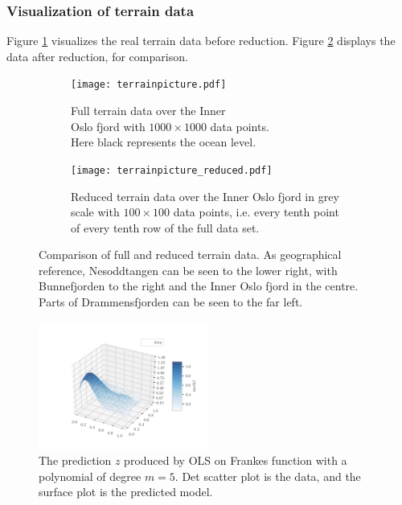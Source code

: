 \subsubsection*{Visualization of terrain data}
Figure \ref{fig:terrainpic} visualizes the real terrain data before reduction. Figure \ref{fig:terrainpic_reduced} displays the data after reduction, for comparison.

\begin{figure}[htbp]
	\centering
	\begin{subfigure}{.5\textwidth}
		\centering
		\texttt{[image: terrainpicture.pdf]}
		\caption{Full terrain data over the Inner \\Oslo fjord with $1000\times 1000$ data points. \\Here black represents the ocean level.}
		\label{fig:terrainpic}
	\end{subfigure}%
	\begin{subfigure}{.5\textwidth}
		\centering
		\texttt{[image: terrainpicture\_reduced.pdf]}
		\caption{Reduced terrain data over the Inner Oslo fjord in grey scale with $100\times 100$ data points, i.e. every tenth point of every tenth row of the full data set.}
	\label{fig:terrainpic_reduced}
	\end{subfigure}
	\caption{Comparison of full and reduced terrain data. As geographical reference, Nesoddtangen can be seen to the lower right, with Bunnefjorden to the right and the Inner Oslo fjord in the centre. Parts of Drammensfjorden can be seen to the far left.}
	\label{fig:terrain}
\end{figure}

\begin{figure}[htbp]
\centering
\label{fig:franke_visual}
\includegraphics[width=0.5\textwidth]{../figures/franke_visual}
	\caption{The prediction $z$ produced by OLS on Frankes function with a polynomial of degree $m=5$. Det scatter plot is the data, and the surface plot is the predicted model.}
\end{figure}

